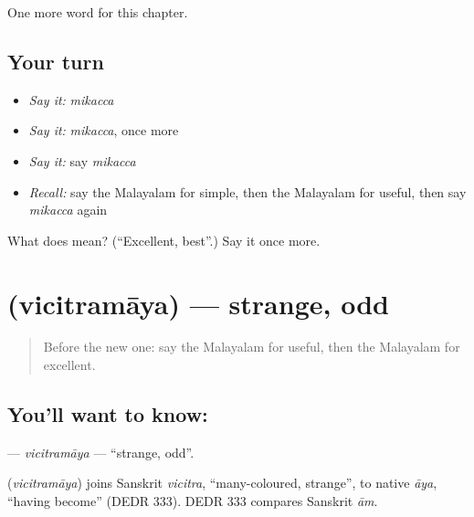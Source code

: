 \begin{grammarlens}[title={What you've built}]
One more word for this chapter.
\end{grammarlens}

\subsection*{Your turn}
\begin{itemize}
\raggedright
  \item \emph{Say it:} \emph{mikacca}
  \item \emph{Say it:} \emph{mikacca}, once more
  \item \emph{Say it:} say \emph{mikacca}
  \item \emph{Recall:} say the Malayalam for simple, then the Malayalam for useful, then say \emph{mikacca} again
\end{itemize}

\begin{tcolorbox}[breakable,colback=teal!4,colframe=teal!35!black,title={Before you move on}]
What does  mean? (\textquotedblleft{}Excellent, best\textquotedblright{}.) Say it once more.
\end{tcolorbox}
\section[\texorpdfstring{\ml{വിചിത്രമായ} (vicitramāya)}{വിചിത്രമായ (vicitramāya)}]{ (vicitramāya) — strange, odd}

\label{lesson:ML-C205-vicitramaya}



\begin{quote}
Before the new one: say the Malayalam for useful, then the Malayalam for excellent.
\end{quote}

\subsection*{You'll want to know: }
\textbf{} — \emph{vicitramāya} — \textquotedblleft{}strange, odd\textquotedblright{}.

\begin{cousinweb}
\textbf{} (\emph{vicitramāya}) joins Sanskrit \emph{vicitra}, \textquotedblleft{}many-coloured, strange\textquotedblright{}, to native \emph{āya}, \textquotedblleft{}having become\textquotedblright{} (DEDR 333). DEDR 333 compares Sanskrit \emph{ām}.
\end{cousinweb}

